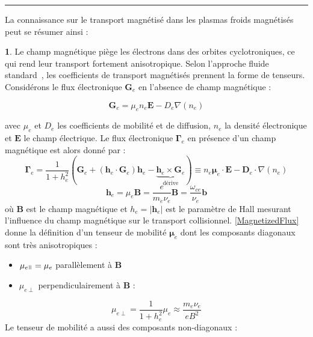\begin{refsection}
\begin{center}
\rule{0.5\textwidth}{1pt}
\end{center}


La connaissance sur le transport magnétisé dans les plasmas froids magnétisés
peut se résumer ainsi :

\textbf{1}. Le champ magnétique piège les électrons dans des orbites
cyclotroniques, ce qui rend leur transport fortement anisotropique. Selon
l'approche fluide standard~\parencite{Chen,Rozhansky,Lieberman,Rax}, les
coefficients de transport magnétisés prennent la forme de
tenseurs.
Considérons le flux électronique $\mathbf G_e$ en l'absence de champ magnétique
:

\begin{equation}
\mathbf G_e = \mu_e n_e\mathbf E - D_e\nabla(n_e)
\end{equation}

avec $\mu_e$ et $D_e$ les coefficients de mobilité et de diffusion, $n_e$ la
densité électronique et $\mathbf E$ le champ électrique. Le flux
électronique $\boldsymbol{\Gamma}_e$ en présence d'un champ magnétique est alors
donné par :
\begin{equation}
\label{MagnetizedFlux}
\boldsymbol{\Gamma}_e = \frac{1}{1+h_e^2}(\mathbf G_e + (\mathbf
h_e\cdot\mathbf G_e)\mathbf h_e-\underbrace{\mathbf h_e\times\mathbf
G_e}_\text{dérive})\equiv n_e\boldsymbol{\mu}_e\cdot\mathbf
E-\mathbf{D}_e\cdot\nabla(n_e)
\end{equation}
\begin{equation}
\mathbf h_e=\mu_e\mathbf B=\frac{e}{m_e\nu_e}\mathbf
B=\frac{\omega_{ce}}{\nu_e}\mathbf b
\end{equation}
où $\mathbf B$ est le champ magnétique et $h_e=|\mathbf h_e|$ est le paramètre
de Hall mesurant l'influence du champ
magnétique sur le transport collisionnel. \eqref{MagnetizedFlux} donne la
définition d'un tenseur de mobilité $\boldsymbol{\mu}_e$ dont les composants
diagonaux sont très anisotropiques :
 
\begin{itemize}
  \item $\mu_{e\para}=\mu_e$ parallèlement à $\mathbf B$
  \item $\mu_{e\perp}$ perpendiculairement à $\mathbf B$ :
\end{itemize}

\begin{equation}
\mu_{e\perp}=\frac{1}{1+h_e^2}\mu_e\approx\frac{m_e\nu_e}{eB^2}
\end{equation}
Le tenseur de mobilité a aussi des composants non-diagonaux :


\end{refsection}
